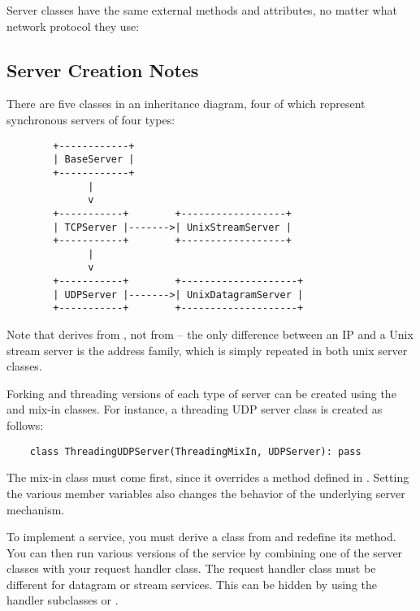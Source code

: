 Server classes have the same external methods and attributes, no
matter what network protocol they use:


\subsection{Server Creation Notes}

There are five classes in an inheritance diagram, four of which represent
synchronous servers of four types:

\begin{verbatim}
        +------------+
        | BaseServer |
        +------------+
              |
              v
        +-----------+        +------------------+
        | TCPServer |------->| UnixStreamServer |
        +-----------+        +------------------+
              |
              v
        +-----------+        +--------------------+
        | UDPServer |------->| UnixDatagramServer |
        +-----------+        +--------------------+
\end{verbatim}

Note that  derives from , not
from  -- the only difference between an IP and a
Unix stream server is the address family, which is simply repeated in both
unix server classes.

Forking and threading versions of each type of server can be created using
the  and  mix-in classes.  For
instance, a threading UDP server class is created as follows:

\begin{verbatim}
    class ThreadingUDPServer(ThreadingMixIn, UDPServer): pass
\end{verbatim}

The mix-in class must come first, since it overrides a method defined in
.  Setting the various member variables also changes the
behavior of the underlying server mechanism.

To implement a service, you must derive a class from
 and redefine its  method.  You
can then run various versions of the service by combining one of the server
classes with your request handler class.  The request handler class must be
different for datagram or stream services.  This can be hidden by using the
handler subclasses  or .

